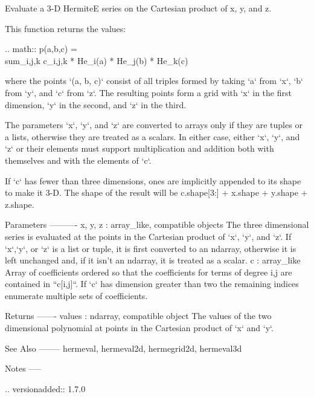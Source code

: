 \begin{DoxyVerb}Evaluate a 3-D HermiteE series on the Cartesian product of x, y, and z.

This function returns the values:

.. math:: p(a,b,c) = \\sum_{i,j,k} c_{i,j,k} * He_i(a) * He_j(b) * He_k(c)

where the points `(a, b, c)` consist of all triples formed by taking
`a` from `x`, `b` from `y`, and `c` from `z`. The resulting points form
a grid with `x` in the first dimension, `y` in the second, and `z` in
the third.

The parameters `x`, `y`, and `z` are converted to arrays only if they
are tuples or a lists, otherwise they are treated as a scalars. In
either case, either `x`, `y`, and `z` or their elements must support
multiplication and addition both with themselves and with the elements
of `c`.

If `c` has fewer than three dimensions, ones are implicitly appended to
its shape to make it 3-D. The shape of the result will be c.shape[3:] +
x.shape + y.shape + z.shape.

Parameters
----------
x, y, z : array_like, compatible objects
    The three dimensional series is evaluated at the points in the
    Cartesian product of `x`, `y`, and `z`.  If `x`,`y`, or `z` is a
    list or tuple, it is first converted to an ndarray, otherwise it is
    left unchanged and, if it isn't an ndarray, it is treated as a
    scalar.
c : array_like
    Array of coefficients ordered so that the coefficients for terms of
    degree i,j are contained in ``c[i,j]``. If `c` has dimension
    greater than two the remaining indices enumerate multiple sets of
    coefficients.

Returns
-------
values : ndarray, compatible object
    The values of the two dimensional polynomial at points in the Cartesian
    product of `x` and `y`.

See Also
--------
hermeval, hermeval2d, hermegrid2d, hermeval3d

Notes
-----

.. versionadded:: 1.7.0\end{DoxyVerb}
 \mbox{\label{namespacenumpy_1_1polynomial_1_1hermite__e_ac216c954fc1da9cad4c673ed4f2bc9d1}} 
